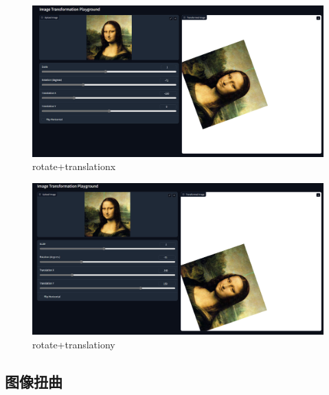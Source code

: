 \documentclass{article}
\begin{document}
\begin{figure}[H]
	\centering
	\includegraphics[scale=0.4]{result/global/rotate_translationx}
	\caption{rotate+translationx}
	\label{fig:rotate_translationx}
\end{figure}
\begin{figure}[H]
	\centering
	\includegraphics[scale=0.4]{result/global/rotate_translationxy}
	\caption{rotate+translationy}
	\label{fig:rotate_translationxy}
\end{figure}

	\subsection{图像扭曲}
\end{document}
